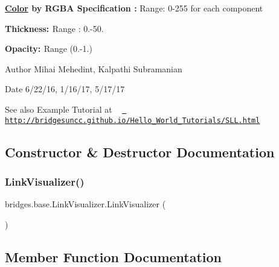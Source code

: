 {\bfseries{ \mbox{\hyperlink{classbridges_1_1base_1_1_color}{Color}} by R\+G\+BA Specification \+:}} Range\+: 0-\/255 for each component 

{\bfseries{ Thickness\+: }} Range \+: 0.-\/50.

{\bfseries{ Opacity\+: }} Range (0.-\/1.) 

\begin{DoxyAuthor}{Author}
Mihai Mehedint, Kalpathi Subramanian
\end{DoxyAuthor}
\begin{DoxyDate}{Date}
6/22/16, 1/16/17, 5/17/17
\end{DoxyDate}
\begin{DoxySeeAlso}{See also}
Example Tutorial at ~\newline
 \href{http://bridgesuncc.github.io/Hello_World_Tutorials/SLL.html}{\texttt{ http\+://bridgesuncc.\+github.\+io/\+Hello\+\_\+\+World\+\_\+\+Tutorials/\+S\+L\+L.\+html}} 
\end{DoxySeeAlso}


\subsection{Constructor \& Destructor Documentation}
\mbox{\label{classbridges_1_1base_1_1_link_visualizer_a0b69f099fa264ae9097b0efe278c6a1b}} 
\subsubsection{\texorpdfstring{LinkVisualizer()}{LinkVisualizer()}}
{\footnotesize\ttfamily bridges.\+base.\+Link\+Visualizer.\+Link\+Visualizer (\begin{DoxyParamCaption}{ }\end{DoxyParamCaption})}



\subsection{Member Function Documentation}
\mbox{\label{classbridges_1_1base_1_1_link_visualizer_a3ed52d98ecab99c6d8dd136fba913b7d}} 
